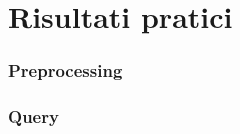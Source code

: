 \section{Risultati pratici}

\begin{frame}
	\sectionpage
	\centering
\end{frame}

\begin{frame}
	\frametitle{Preprocessing}
	\centering
\end{frame}

\begin{frame}
	\frametitle{Query}
	\centering
\end{frame}


